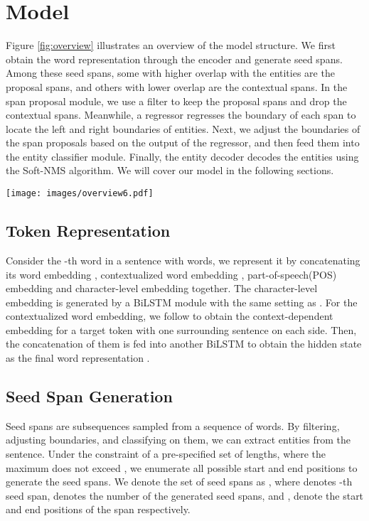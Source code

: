 \documentclass[11pt,a4paper]{article}
\begin{document}
\section{Model}
Figure \ref{fig:overview} illustrates an overview of the model structure. We first obtain the word representation through the encoder and generate seed spans. Among these seed spans, some with higher overlap with the entities are the proposal spans, and others with lower overlap are the contextual spans. In the span proposal module, we use a filter to keep the proposal spans and drop the contextual spans. Meanwhile, a regressor regresses the boundary of each span to locate the left and right boundaries of entities. Next, we adjust the boundaries of the span proposals based on the output of the regressor, and then feed them into the entity classifier module. Finally, the entity decoder decodes the entities using the Soft-NMS algorithm. We will cover our model in the following sections.

\begin{figure*}[h]
  \centering
  \texttt{[image: images/overview6.pdf]}
  \caption{The overall architecture of the Two-stage Identifier. }
   \label{fig:overview}
\end{figure*}

\subsection{Token Representation}

Consider the -th word in a sentence with  words, we represent it by concatenating its word embedding , contextualized word embedding , part-of-speech(POS) embedding  and character-level embedding  together. The character-level embedding is generated by a BiLSTM module with the same setting as \citep{ju-etal-2018-neural}.
For the contextualized word embedding, we follow \citep{yu-etal-2020-named} to obtain the context-dependent embedding for a target token with one surrounding sentence on each side. Then, the concatenation of them is fed into another BiLSTM to obtain the hidden state as the final word representation .

\subsection{Seed Span Generation}

Seed spans are subsequences sampled from a sequence of words. By filtering, adjusting boundaries, and classifying on them, we can extract entities from the sentence. Under the constraint of a pre-specified set of lengths, where the maximum does not exceed , we enumerate all possible start and end positions to generate the seed spans. We denote the set of seed spans as , where  denotes -th seed span,  denotes the number of the generated seed spans, and ,  denote the start and end positions of the span respectively.
\end{document}
